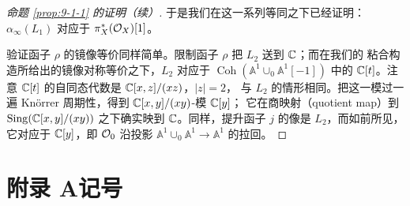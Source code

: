 

\begin{proof}[命题 \ref{prop:9-1-1} 的证明（续）]
于是我们在这一系列等同之下已经证明：$\alpha_\infty(L_1)$ 对应于 $\pi_X^*(\mathcal{O}_X)[1]$。

验证函子 $\rho$ 的镜像等价同样简单。限制函子 $\rho$ 把 $L_2$ 送到 $\mathbb{C}$；而在我们的
粘合构造所给出的镜像对称等价之下，$L_2$ 对应于 $\operatorname{Coh}(\mathbb A^1\cup_0
\mathbb A^1[-1])$ 中的 $\mathbb{C}[t]$。注意 $\mathbb{C}[t]$ 的自同态代数是 $\mathbb{C}[x,z]/(xz)$，$|z|=2$，
与 $L_2$ 的情形相同。把这一模过一遍 Knörrer 周期性，得到 $\mathbb{C}[x,y]/(xy)$-模 $\mathbb{C}[y]$；
它在商映射（quotient map）到 $\operatorname{Sing}(\mathbb{C}[x,y]/(xy))$ 之下确实映到 $\mathbb{C}$。同样，提升函子
$j$ 的像是 $L_2$，而如前所见，它对应于 $\mathbb{C}[y]$，即 $\mathcal{O}_0$ 沿投影
$\mathbb A^1\cup_0\mathbb A^1\to\mathbb A^1$ 的拉回。
\end{proof}





\section*{附录 A\quad 记号}


